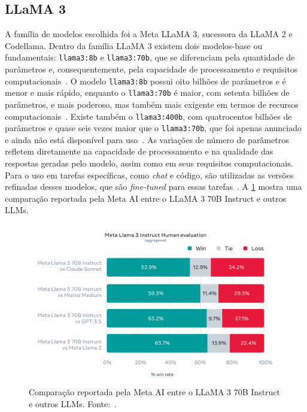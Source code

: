 \documentclass[journal]{IEEEtran}
\begin{document}
\subsection{LLaMA 3\label{sec:llama3}}

\noindent%
A família de modelos escolhida foi a Meta LLaMA 3, sucessora da LLaMA 2 e Codellama.
Dentro da família LLaMA 3 existem dois modelos-base ou fundamentais: \texttt{llama3:8b} e \texttt{llama3:70b}, que se diferenciam pela quantidade de parâmetros e, consequentemente, pela capacidade de processamento e requisitos computacionais~\cite{meta2024llama3,llama3modelcard}.
O modelo \texttt{llama3:8b} possui oito bilhões de parâmetros e é menor e mais rápido, enquanto o \texttt{llama3:70b} é maior, com setenta bilhões de parâmetros, e mais poderoso, mas também mais exigente em termos de recursos computacionais~\cite{meta2024llama3}.
Existe também o \texttt{llama3:400b}, com quatrocentos bilhões de parâmetros e quase seis vezes maior que o \texttt{llama3:70b}, que foi apenas anunciado e ainda não está disponível para uso~\cite{llama3_400b}.
As variações de número de parâmetros refletem diretamente na capacidade de processamento e na qualidade das respostas geradas pelo modelo, assim como em seus requisitos computacionais.
Para o uso em tarefas específicas, como \textit{chat} e código, são utilizadas as versões refinadas desses modelos, que são \textit{fine-tuned} para essas tarefas~\cite{meta2024llama3,llama3modelcard}.
A \cref{fig:metallama3eval} mostra uma comparação reportada pela Meta AI entre o LLaMA 3 70B Instruct e outros LLMs.

\begin{figure}[ht!]
    \centering
    \includegraphics[width=\textwidth]{media/metallama3eval.png}
    \caption{Comparação reportada pela Meta AI entre o LLaMA 3 70B Instruct e outros LLMs. Fonte:~\cite{meta2024llama3}.\label{fig:metallama3eval}}
\end{figure}
\end{document}
